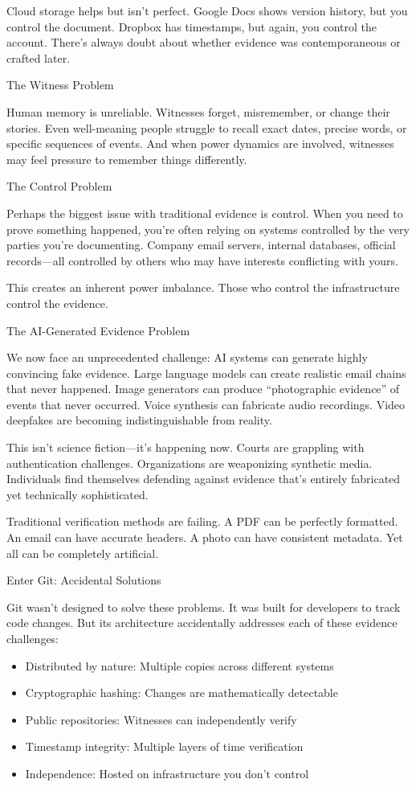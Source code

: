 Cloud storage helps but isn't perfect. Google Docs shows version
history, but you control the document. Dropbox has timestamps, but
again, you control the account. There's always doubt about whether
evidence was contemporaneous or crafted later.

The Witness Problem

Human memory is unreliable. Witnesses forget, misremember, or change
their stories. Even well-meaning people struggle to recall exact dates,
precise words, or specific sequences of events. And when power dynamics
are involved, witnesses may feel pressure to remember things
differently.

The Control Problem

Perhaps the biggest issue with traditional evidence is control. When you
need to prove something happened, you're often relying on systems
controlled by the very parties you're documenting. Company email
servers, internal databases, official records---all controlled by others
who may have interests conflicting with yours.

This creates an inherent power imbalance. Those who control the
infrastructure control the evidence.

The AI-Generated Evidence Problem

We now face an unprecedented challenge: AI systems can generate highly
convincing fake evidence. Large language models can create realistic
email chains that never happened. Image generators can produce
``photographic evidence'' of events that never occurred. Voice synthesis
can fabricate audio recordings. Video deepfakes are becoming
indistinguishable from reality.

This isn't science fiction---it's happening now. Courts are grappling
with authentication challenges. Organizations are weaponizing synthetic
media. Individuals find themselves defending against evidence that's
entirely fabricated yet technically sophisticated.

Traditional verification methods are failing. A PDF can be perfectly
formatted. An email can have accurate headers. A photo can have
consistent metadata. Yet all can be completely artificial.

Enter Git: Accidental Solutions

Git wasn't designed to solve these problems. It was built for developers
to track code changes. But its architecture accidentally addresses each
of these evidence challenges:

\begin{itemize}
\tightlist
\item
  Distributed by nature: Multiple copies across different systems
\item
  Cryptographic hashing: Changes are mathematically detectable\\
\item
  Public repositories: Witnesses can independently verify
\item
  Timestamp integrity: Multiple layers of time verification
\item
  Independence: Hosted on infrastructure you don't control
\end{itemize}

